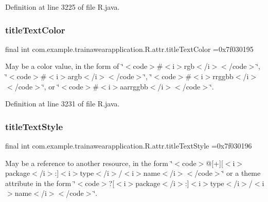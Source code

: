 Definition at line 3225 of file R.\+java.

\mbox{\label{classcom_1_1example_1_1trainawearapplication_1_1_r_1_1attr_ab48157b601f87e32ca393ae840611a74}} 
\subsubsection{\texorpdfstring{titleTextColor}{titleTextColor}}
{\footnotesize\ttfamily final int com.\+example.\+trainawearapplication.\+R.\+attr.\+title\+Text\+Color =0x7f030195\hspace{0.3cm}{\ttfamily [static]}}

May be a color value, in the form of \char`\"{}$<$code$>$\#$<$i$>$rgb$<$/i$>$$<$/code$>$\char`\"{}, \char`\"{}$<$code$>$\#$<$i$>$argb$<$/i$>$$<$/code$>$\char`\"{}, \char`\"{}$<$code$>$\#$<$i$>$rrggbb$<$/i$>$$<$/code$>$\char`\"{}, or \char`\"{}$<$code$>$\#$<$i$>$aarrggbb$<$/i$>$$<$/code$>$\char`\"{}. 

Definition at line 3231 of file R.\+java.

\mbox{\label{classcom_1_1example_1_1trainawearapplication_1_1_r_1_1attr_a60eaa58b691c978bc51934b3d8e97662}} 
\subsubsection{\texorpdfstring{titleTextStyle}{titleTextStyle}}
{\footnotesize\ttfamily final int com.\+example.\+trainawearapplication.\+R.\+attr.\+title\+Text\+Style =0x7f030196\hspace{0.3cm}{\ttfamily [static]}}

May be a reference to another resource, in the form \char`\"{}$<$code$>$@\mbox{[}+\mbox{]}\mbox{[}$<$i$>$package$<$/i$>$\+:\mbox{]}$<$i$>$type$<$/i$>$/$<$i$>$name$<$/i$>$$<$/code$>$\char`\"{} or a theme attribute in the form \char`\"{}$<$code$>$?\mbox{[}$<$i$>$package$<$/i$>$\+:\mbox{]}$<$i$>$type$<$/i$>$/$<$i$>$name$<$/i$>$$<$/code$>$\char`\"{}. 

